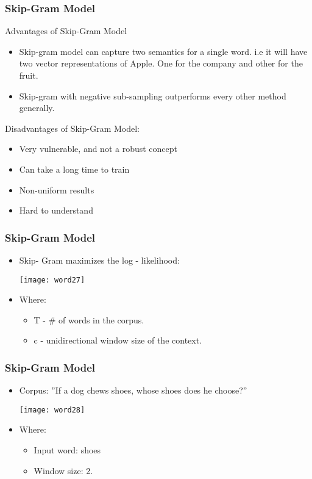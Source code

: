 \begin{frame}[fragile]\frametitle{Skip-Gram Model}
Advantages of Skip-Gram Model
\begin{itemize}
\item Skip-gram model can capture two semantics for a single word. i.e it will have two vector representations of Apple. One for the company and other for the fruit.
\item     Skip-gram with negative sub-sampling outperforms every other method generally.
\end{itemize}
Disadvantages  of  Skip-Gram Model:
\begin{itemize}
\item Very vulnerable, and not a robust concept
\item Can take a long time to train
\item Non-uniform results
\item Hard to understand 
\end{itemize}
\end{frame}


\begin{frame}[fragile]\frametitle{Skip-Gram Model}
\begin{itemize}
\item Skip- Gram maximizes the log - likelihood:
\begin{center}
\texttt{[image: word27]}
\end{center}
\item Where:
\begin{itemize}
\item T - \# of words in the corpus.
\item c - unidirectional window size of the context.
\end{itemize}
\end{itemize}
\end{frame}
\begin{frame}[fragile]\frametitle{Skip-Gram Model}
\begin{itemize}
\item Corpus: ''If a dog chews shoes, whose shoes does he choose?''
\begin{center}
\texttt{[image: word28]}
\end{center}
\item Where:
\begin{itemize}
\item Input word: shoes
\item Window size: 2.
\end{itemize}
\end{itemize}
\end{frame}



